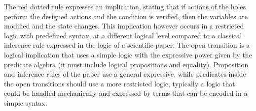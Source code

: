 \documentclass{llncs}
\newcommand{\Simon}{\\\hfill\mdash Simon}
\newcommand{\noteSB}[2][color=green!40, size=\tiny]{\todo[#1]{{#2}\Simon}}
\newcommand{\Ludo}{\\\hfill\mdash Ludo}
\newcommand{\noteLH}[2][color=orange!40, size=\tiny]{\todo[#1]{{#2}\Ludo}}
\newcommand{\newCoord}[1]{{\color{blue}#1}}
\newcommand{\mdash}[1][]{---#1}
\newcommand{\goesto}[2][]{\ensuremath{\xrightarrow[{#1}\relax]{#2}}}
\begin{document}



\newCoord{The red dotted rule expresses an implication, stating that if actions of the holes perform the designed actions and the condition is verified, then the variables are modified and the state changes. This implication however occurs in a restricted logic with predefined syntax, at a different logical level compared to  a classical
inference rule expressed in the logic of a scientific paper. 
 The open transition is  a logical implication that uses a simple logic with the 
 expressive power  given by the predicate algebra (it must include logical 
 propositions and equality). 
 Proposition and inference rules of the paper use a general expressive, while predicates inside the open transitions should use a more restricted logic, typically a logic that could  be handled mechanically and expressed by terms that can be encoded in a simple syntax.}
\end{document}
